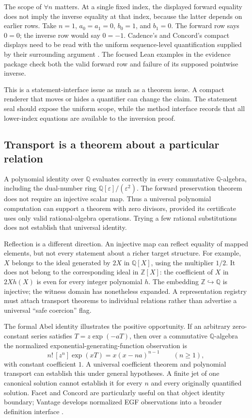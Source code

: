 \documentclass[11pt,letterpaper]{article}
\newcommand{\Z}{\mathbb Z}
\newcommand{\Q}{\mathbb Q}
\begin{document}
The scope of \(\forall n\) matters. At a single fixed index, the displayed
forward equality does not imply the inverse equality at that index, because
the latter depends on earlier rows. Take \(n=1\), \(a_0=a_1=0\), \(b_0=1\),
and \(b_1=0\). The forward row says \(0=0\); the inverse row would say
\(0=-1\). Cadence's and Concord's compact displays need to be read with the
uniform sequence-level quantification supplied by their surrounding argument
\cite[\S8.3]{cadence}\cite[\S8.3]{concord}. The focused Lean examples in the
evidence package check both the valid forward row and failure of its supposed
pointwise inverse.

This is a statement-interface issue as much as a theorem issue. A compact
renderer that moves or hides a quantifier can change the claim. The statement
seal should expose the uniform scope, while the method interface records that
all lower-index equations are available to the inversion proof.

\subsection{Transport is a theorem about a particular relation}
A polynomial identity over \(\Q\) evaluates correctly in every commutative
\(\Q\)-algebra, including the dual-number ring \(\Q[\varepsilon]/(\varepsilon^2)\).
The forward preservation theorem does not require an injective scalar map.
Thus a universal polynomial computation can support a theorem with zero
divisors, provided its certificate uses only valid rational-algebra operations.
Trying a few rational substitutions does not establish that universal identity.

Reflection is a different direction. An injective map can reflect equality of
mapped elements, but not every statement about a richer target structure. For
example, \(X\) belongs to the ideal generated by \(2X\) in \(\Q[X]\), using
the multiplier \(1/2\). It does not belong to the corresponding ideal in
\(\Z[X]\): the coefficient of \(X\) in \(2Xh(X)\) is even for every integer
polynomial \(h\). The embedding \(\Z\hookrightarrow\Q\) is injective; the
witness domain has nonetheless expanded. A representation registry must attach
transport theorems to individual relations rather than advertise a universal
``safe coercion'' flag.

The formal Abel identity illustrates the positive opportunity. If an arbitrary
zero-constant series satisfies \(T=z\exp(-aT)\), then over a commutative
\(\Q\)-algebra the normalized exponential-generating-function observation is
\[
 n!\,[z^n]\exp(xT)=x(x-na)^{n-1}\qquad(n\ge1),
\]
with constant coefficient \(1\). A universal coefficient theorem and polynomial
transport can establish this under general hypotheses. A finite jet of one
canonical solution cannot establish it for every \(n\) and every originally
quantified solution. Facet and Concord are particularly useful on that object
identity boundary; Vantage develops normalized EGF observations into a broader
definition interface \cite{facet,concord,vantage}.
\end{document}
